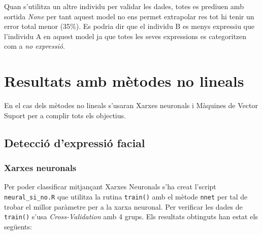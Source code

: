 \documentclass[a4paper]{article}
\begin{document}
\begin{figure}[H]
	\centering
\end{figure}

Quan s'utilitza un altre individu per validar les dades, totes es prediuen amb sortida \emph{None} per tant aquest model no ens permet extrapolar res tot hi tenir un error total menor (35\%). Es podria dir que el individu B es menys expressiu que l’individu A en aquest model ja que totes les seves expressions es categoritzen com a \emph{no expressió}.

\section{Resultats amb mètodes no lineals}
En el cas dels mètodes no lineals s'usaran Xarxes neuronals i Màquines de Vector Suport per a complir tots els objectius.

\subsection{Detecció d'expressió facial}
\subsubsection{Xarxes neuronals}

Per poder classificar mitjançant Xarxes Neuronals s'ha creat l'script \verb|neural_si_no.R| que utilitza la rutina \verb|train()| amb el mètode \verb|nnet| per tal de trobar el millor paràmetre per a la xarxa neuronal. Per verificar les dades de \verb|train()| s'usa \emph{Cross-Validation} amb 4 grups. Els resultats obtinguts han estat els següents:
\end{document}
